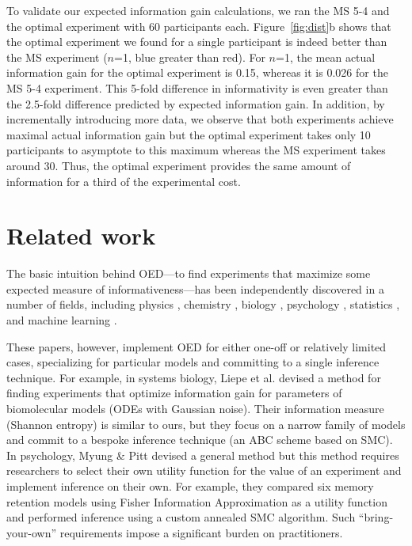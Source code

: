\documentclass{article}
\begin{document}
To validate our expected information gain calculations, we ran the MS 5-4 and the optimal experiment with 60 participants each.
Figure~\ref{fig:dist}b shows that the optimal experiment we found for a single participant is indeed better than the MS experiment ($n$=1, blue greater than red).
For $n$=1, the mean actual information gain for the optimal experiment is 0.15, whereas it is 0.026 for the MS 5-4 experiment.
This 5-fold difference in informativity is even greater than the 2.5-fold difference  predicted by expected information gain.
In addition, by incrementally introducing more data, we observe that both experiments achieve maximal actual information gain but the optimal experiment takes only 10 participants to asymptote to this maximum whereas the MS experiment takes around 30.
Thus, the optimal experiment provides the same amount of information for a third of the experimental cost.


\section{Related work}

The basic intuition behind OED---to find experiments that maximize some expected measure of informativeness---has been independently discovered in a number of fields, including physics \cite{vanDenBerg2003}, chemistry \cite{Huan2010}, biology \cite{Vanlier2012, Liepe2013}, psychology \cite{Myung2009}, statistics \cite{Lindley1956}, and machine learning \cite{Golovin2010}.

These papers, however, implement OED for either one-off or relatively limited cases, specializing for  particular models and committing to a single inference technique.
For example, in systems biology, Liepe et al. \cite{Liepe2013} devised a method for finding experiments that optimize information gain for parameters of biomolecular models (ODEs with Gaussian noise).
Their information measure (Shannon entropy) is similar to ours, but they focus on a narrow family of models and commit to a bespoke inference technique (an ABC scheme based on SMC).
In psychology, Myung \& Pitt \cite{Myung2009} devised a general method but this method requires researchers to select their own utility function for the value of an experiment and implement inference on their own.
For example, they compared six memory retention models using Fisher Information Approximation as a utility function and performed inference using a custom annealed SMC algorithm.
Such ``bring-your-own'' requirements impose a significant burden on practitioners.
\end{document}
